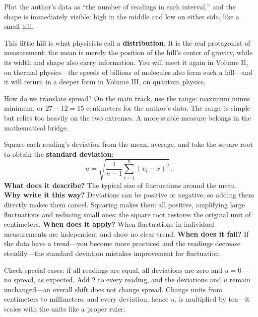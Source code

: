 Plot the author's data as ``the number of readings in each interval,'' and the shape is immediately visible: high in the middle and low on either side, like a small hill.

\begin{center}
\end{center}

This little hill is what physicists call a \textbf{distribution}. It is the real protagonist of measurement: the mean is merely the position of the hill's center of gravity, while its width and shape also carry information. You will meet it again in Volume II, on thermal physics---the speeds of billions of molecules also form such a hill---and it will return in a deeper form in Volume III, on quantum physics.

How do we translate spread? On the main track, use the range: maximum minus minimum, or \(27-12=15\) centimeters for the author's data. The range is simple but relies too heavily on the two extremes. A more stable measure belongs in the mathematical bridge.

\begin{mathbridge}
Square each reading's deviation from the mean, average, and take the square root to obtain the \textbf{standard deviation}:
\[
u=\sqrt{\frac{1}{n-1}\sum_{i=1}^{n}\left(x_i-\bar{x}\right)^2}\,.
\]
\textbf{What does it describe?} The typical size of fluctuations around the mean. \textbf{Why write it this way?} Deviations can be positive or negative, so adding them directly makes them cancel. Squaring makes them all positive, amplifying large fluctuations and reducing small ones; the square root restores the original unit of centimeters. \textbf{When does it apply?} When fluctuations in individual measurements are independent and show no clear trend. \textbf{When does it fail?} If the data have a trend---you become more practiced and the readings decrease steadily---the standard deviation mistakes improvement for fluctuation.

Check special cases: if all readings are equal, all deviations are zero and \(u=0\)---no spread, as expected. Add \(2\) to every reading, and the deviations and \(u\) remain unchanged---an overall shift does not change spread. Change units from centimeters to millimeters, and every deviation, hence \(u\), is multiplied by ten---it scales with the units like a proper ruler.
\end{mathbridge}

